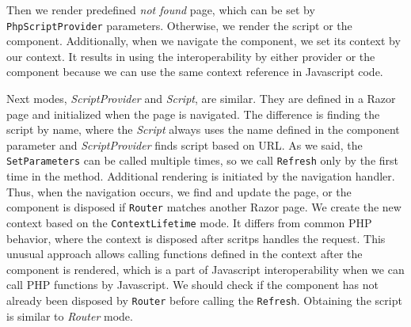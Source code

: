 Then we render predefined \textit{not found} page, which can be set by \texttt{PhpScriptProvider} parameters.
Otherwise, we render the script or the component.
Additionally, when we navigate the component, we set its context by our context.
It results in using the interoperability by either provider or the component because we can use the same context reference in Javascript code.
\par
Next modes, \textit{ScriptProvider} and \textit{Script}, are similar.
They are defined in a Razor page and initialized when the page is navigated.  
The difference is finding the script by name, where the \textit{Script} always uses the name defined in the component parameter and \textit{ScriptProvider} finds script based on URL.
As we said, the \texttt{SetParameters} can be called multiple times, so we call \texttt{Refresh} only by the first time in the method.
Additional rendering is initiated by the navigation handler.
Thus, when the navigation occurs, we find and update the page, or the component is disposed if \texttt{Router} matches another Razor page.
We create the new context based on the \texttt{ContextLifetime} mode.
It differs from common PHP behavior, where the context is disposed after scritps handles the request.
This unusual approach allows calling functions defined in the context after the component is rendered, which is a part of Javascript interoperability when we can call PHP functions by Javascript.
We should check if the component has not already been disposed by \texttt{Router} before calling the \texttt{Refresh}.
Obtaining the script is similar to \textit{Router} mode.

